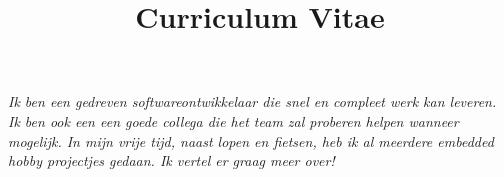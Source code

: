 \documentclass[11pt,a4paper,sans]{moderncv} %
\title{\huge{Curriculum Vitae}}
\begin{document}




\makecvtitle %



\vspace{-15pt}
\begin{adjustwidth}{50pt}{50pt}
    \textit{Ik ben een gedreven softwareontwikkelaar die snel en compleet werk kan leveren.
    Ik ben ook een een goede collega die het team zal proberen helpen wanneer mogelijk.
    In mijn vrije tijd, naast lopen en fietsen, heb ik al meerdere embedded hobby projectjes gedaan. Ik vertel er graag meer over!}
\end{adjustwidth}
\vspace{10pt}
\end{document}
